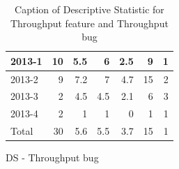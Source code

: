 \documentclass[UKenglish]{ifimaster}  %
\begin{document}
\begin{appendices}
\begin{table}[!htbp]
\begin{adjustwidth}{-1.5cm}{}
\begin{subfigure}[b]{0.3\textwidth}
{\begin{tabular}{ | l | r | r | r | r | r | r | }
 2013-1  & 10 & 5.5 & 6 & 2.5 & 9 & 1 \\ \hline
 2013-2  & 9 & 7.2 & 7 & 4.7 & 15 & 2 \\ \hline
 2013-3  & 2 & 4.5 & 4.5 & 2.1 & 6 & 3 \\ \hline
 2013-4  & 2 & 1 & 1 & 0 &1 & 1 \\ \hline
 Total  & 30 & 5.6 & 5.5 & 3.7 & 15 & 1 \\ \hline
\end{tabular}
}
\caption{DS - Throughput bug}
 \label{DS:TPB:4}
\end{subfigure}
\end{adjustwidth}
\caption[Optional caption for list of figures]{Caption of Descriptive Statistic for Throughput feature and Throughput bug}
\label{DS:4:2}
\end{table}



\begin{table}[!htbp]
  \begin{adjustwidth}{-2.5cm}{}
\begin{subfigure}[b]{0.7\textwidth}
\end{subfigure}
\end{adjustwidth}
\end{table}
\end{appendices}
\end{document}
